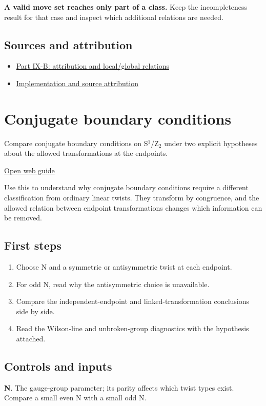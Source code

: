 \documentclass[11pt,a4paper]{article}
\begin{document}
\textbf{A valid move set reaches only part of a class.} Keep the incompleteness result for that case and inspect which additional relations are needed.

\subsection*{Sources and attribution}
\begin{itemize}
\item \href{https://karlesmarin.github.io/ghu-explorer/papers/part-ix-b/index.html}{Part IX-B: attribution and local/global relations}
\item \href{https://github.com/karlesmarin/ghu-lab/blob/main/src/sections/relations_section.js}{Implementation and source attribution}
\end{itemize}
\section{Conjugate boundary conditions}
Compare conjugate boundary conditions on S\ensuremath{{}^{1}}/Z\ensuremath{{}_{2}} under two explicit hypotheses about the allowed transformations at the endpoints.

\href{https://karlesmarin.github.io/ghu-explorer/guide/cbclass/index.html}{Open web guide}

Use this to understand why conjugate boundary conditions require a different classification from ordinary linear twists. They transform by congruence, and the allowed relation between endpoint transformations changes which information can be removed.
\subsection*{First steps}
\begin{enumerate}
\item Choose N and a symmetric or antisymmetric twist at each endpoint.
\item For odd N, read why the antisymmetric choice is unavailable.
\item Compare the independent-endpoint and linked-transformation conclusions side by side.
\item Read the Wilson-line and unbroken-group diagnostics with the hypothesis attached.
\end{enumerate}
\subsection*{Controls and inputs}
\textbf{N}. The gauge-group parameter; its parity affects which twist types exist. Compare a small even N with a small odd N.
\end{document}
